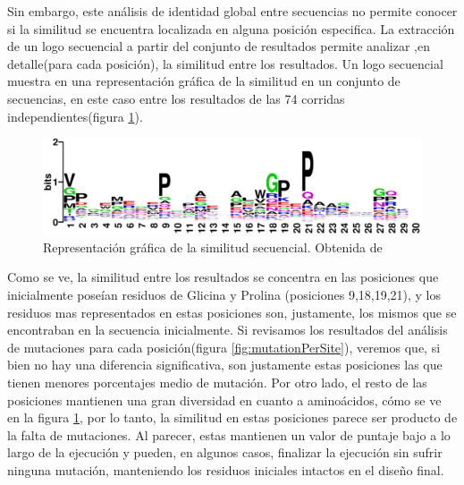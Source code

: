Sin embargo, este análisis de identidad global entre secuencias no permite conocer si la similitud se encuentra localizada en alguna posición especifica.
La extracción de un logo secuencial a partir del conjunto de resultados permite analizar ,en detalle(para cada posición), la similitud entre los resultados. 
Un logo secuencial muestra en una representación gráfica de la similitud en un conjunto de secuencias\cite{schneider1990sequence}, 
en este caso entre los resultados de las 74 corridas independientes(figura \ref{fig:logo}).

\begin{figure}[h]
\includegraphics[width=\textwidth]{img/resultados/logo.png}
\caption{Representación gráfica de la similitud secuencial. Obtenida de \cite{crooks2004weblogo}}
\label{fig:logo}
\end{figure}

Como se ve, la similitud entre los resultados se concentra en las posiciones que inicialmente  
poseían residuos de Glicina y Prolina (posiciones 9,18,19,21), y los residuos mas representados en estas posiciones son, justamente, los mismos que se encontraban en la secuencia inicialmente. 
Si revisamos los resultados del análisis de mutaciones para cada posición(figura \ref{fig:mutationPerSite}), veremos que, si bien no hay una diferencia significativa, 
son justamente estas posiciones las que tienen menores porcentajes medio de mutación.
Por otro lado, el resto de las posiciones mantienen una gran diversidad en cuanto a aminoácidos, cómo se ve en la figura \ref{fig:logo},
por lo tanto, la similitud en estas posiciones parece ser producto de la falta de mutaciones.
Al parecer, estas mantienen un valor de puntaje bajo a lo largo de la ejecución y pueden, en algunos casos, finalizar la ejecución sin sufrir ninguna mutación, manteniendo los residuos iniciales intactos en el diseño final.





